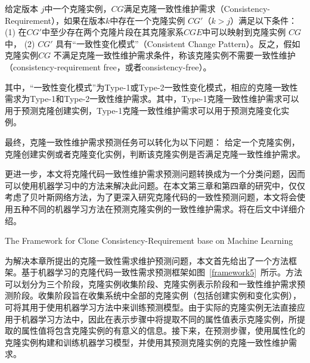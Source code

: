 \begin{definition}
 \label{def-requirement}
给定版本 $j$中一个克隆实例，$CG$满足克隆一致性维护需求（Consistency-Requirement），如果在版本$k$中存在一个克隆实例 $CG'$（$k>j$）满足以下条件： (1) 在$CG'$中至少存在两个克隆片段在其克隆家系$CGE$中可以映射到克隆实例 $CG$中， (2) $CG'$ 具有“一致性变化模式”（Consistent Change Pattern）。反之，假如克隆实例$CG$ 不满足克隆一致性维护需求条件，称该克隆实例不需要一致性维护（consistency-requirement free，或者consistency-free）。
\end{definition}


其中，“一致性变化模式”为Type-1或Type-2一致性变化模式，相应的克隆一致性需求为Type-1和Type-2一致性维护需求。其中，Type-1克隆一致性维护需求可以用于预测克隆创建实例，Type-1克隆一致性维护需求可以用于预测克隆变化实例。

最终，克隆一致性维护需求预测任务可以转化为以下问题：
 给定一个克隆实例，克隆创建实例或者克隆变化实例，判断该克隆实例是否满足克隆一致性维护需求。
 
 更进一步，本文将克隆代码一致性维护需求预测问题转换成为一个分类问题，因而可以使用机器学习中的方法来解决此问题。在本文第三章和第四章的研究中，仅仅考虑了贝叶斯网络方法，为了更深入研究克隆代码的一致性预测问题，本文将会使用五种不同的机器学习方法在预测克隆实例的一致性维护需求。将在后文中详细介绍。


{The Framework for Clone Consistency-Requirement base on Machine Learning}

为解决本章所提出的克隆一致性需求维护预测问题，本文首先给出了一个方法框架。基于机器学习的克隆代码一致性需求预测框架如图~\ref{framework5}~所示。方法可以划分为三个阶段，克隆实例收集阶段、克隆实例表示阶段和一致性维护需求预测阶段。收集阶段旨在收集系统中全部的克隆实例（包括创建实例和变化实例），可将其用于使用机器学习方法中来训练预测模型。由于实际的克隆实例无法直接应用于机器学习方法中，因此在表示步骤中将提取不同的属性值表示克隆实例，所提取的属性值将包含克隆实例的有意义的信息。接下来，在预测步骤，使用属性化的克隆实例构建和训练机器学习模型，并使用其预测克隆实例的克隆一致性维护需求。


